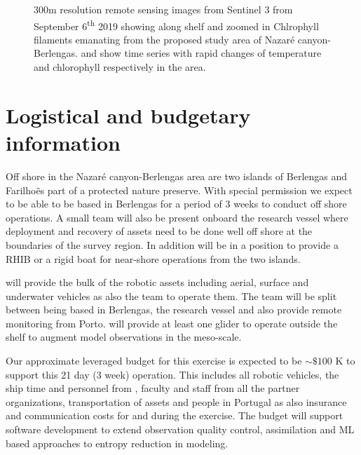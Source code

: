 \begin{figure}[!h]
  \caption{300m resolution remote sensing images from Sentinel 3 from
    September 6\textsuperscript{th} 2019 showing along shelf
     and zoomed in Chlrophyll filaments
     emanating from the proposed study area of
    Nazar\'e canyon-Berlengas.  and
     show time series with rapid changes of
    temperature and chlorophyll respectively in the area.}
  \label{fig:studyarea-2}
\end{figure}

\section*{Logistical and budgetary information}

Off shore in the Nazar\'e canyon-Berlengas area are two islands of
Berlengas and Farilho\~es part of a protected nature preserve. With
special permission we expect to be able to be based in Berlengas for a
period of 3 weeks to conduct off shore operations. A small team will
also be present onboard the \inst research vessel where deployment and
recovery of assets need to be done well off shore at the boundaries of
the survey region. In addition \inst will be in a position to provide
a RHIB or a rigid boat for near-shore operations from the two
islands.

\univ will provide the bulk of the robotic assets including
aerial, surface and underwater vehicles as also the team to operate
them. The team will be split between being based in Berlengas, the
research vessel and also provide remote monitoring from Porto. \soc
will provide at least one glider to operate outside the shelf to
augment model observations in the meso-scale.

Our approximate leveraged budget for this exercise is expected to be
$\sim \$100$ K to support this 21 day (3 week) operation. This
includes all robotic vehicles, the ship time and personnel from
\inste, faculty and staff from all the partner organizations,
transportation of assets and people in Portugal as also insurance and
communication costs for and during the exercise. The budget will
support software development to extend observation quality control,
assimilation and ML based approaches to entropy reduction in modeling.

